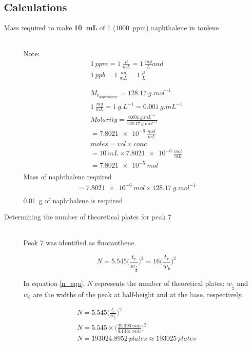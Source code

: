 \documentclass[a4paper, 12pt]{article}
\begin{document}
\subsection{Calculations}

\begin{description}
\item[Mass required to make \textbf{\SI{10}{mL}} of \SI{1}{} (\SI{1000}{ppm}) naphthalene in toulene] \hfill \\
	Note: 
\begin{gather*}
\SI{1}{ppm} = \SI{1}{\frac{\mu}{mL}} = \SI{1}{\frac{mg}{L}} and \\
\SI{1}{ppb} = \SI{1}{\frac{ng}{mL}} = \SI{1}{\frac{\mu}{L}} \\
\\
\\
	M_{r_{naphthalene}} = \SI{128.17}{g.mol^{-1}} \\
	\SI{1}{\frac{mg}{mL}} = \SI{1}{g.L^{-1}} = \SI{0.001}{g.mL^{-1}} \\
	Molarity = \frac{\SI{0.001}{g.mL^{-1}}}{\SI{128.17}{g.mol^{-1}}} \\
	= \SI{7.8021e-6}{\frac{mol}{mL}} \\
	moles = vol \times conc \\
	= \SI{10}{mL} \times \SI{7.8021e-6}{\frac{mol}{mL}} \\
	= \SI{7.8021e-5}{mol} \\
\end{gather*}
	Mass of naphthalene required 
\begin{gather*}
= \SI{7.8021e-6}{mol} \times \SI{128.17}{g.mol^{-1}} \\
\end{gather*}
\SI{0.01}{g} of naphthalene is required

\item[Determining the number of theoretical plates for peak 7] \hfill \\
	Peak 7 was identified as fluoranthene.

	\begin{equation} \label{n_equ}
		N = 5.545\Bigg(\frac{t_r}{w_\frac{1}{2}}\Bigg)^2 = 16\Bigg(\frac{t_r}{w_b}\Bigg)^2
	\end{equation}

	In equation \ref{n_equ}, \(N\) represents the number of theoretical plates; \(w_\frac{1}{2}\) and \(w_b\) are the widths of the peak at half-height and at the base, respectively.

	\begin{gather*}
		N = 5.545\Bigg(\frac{t_r}{w_\frac{1}{2}}\Bigg)^2 \\
		N = \num{5.545} \times \Bigg(\frac{\SI{25.393}{min}}{\SI{0.1361}{min}}\Bigg)^2 \\
		N = \SI{193024.8952}{plates} \approx \SI{193025}{plates}
	\end{gather*}


\end{description}
\end{document}
